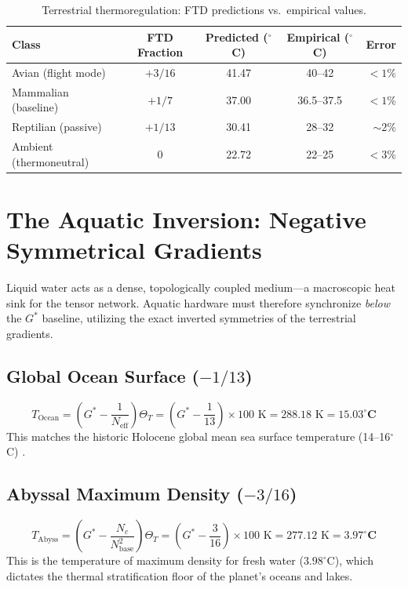 \documentclass[11pt, letterpaper]{article}
\newcommand{\G}{G^*}
\theoremstyle{definition}
\theoremstyle{remark}
\begin{document}
\begin{table}[hbt!]
\centering
\caption{Terrestrial thermoregulation: FTD predictions vs.\ empirical values.}
\label{tab:terrestrial}
\begin{tabular}{@{}lcccr@{}}
\toprule
\textbf{Class} & \textbf{FTD Fraction} & \textbf{Predicted ($^\circ$C)} & \textbf{Empirical ($^\circ$C)} & \textbf{Error} \\
\midrule
Avian (flight mode) & $+3/16$ & 41.47 & 40--42 & $<1\%$ \\
Mammalian (baseline) & $+1/7$ & 37.00 & 36.5--37.5 & $<1\%$ \\
Reptilian (passive) & $+1/13$ & 30.41 & 28--32 & $\sim 2\%$ \\
Ambient (thermoneutral) & $0$ & 22.72 & 22--25 & $<3\%$ \\
\bottomrule
\end{tabular}
\end{table}

\section{The Aquatic Inversion: Negative Symmetrical Gradients}

Liquid water acts as a dense, topologically coupled medium---a macroscopic heat sink for the tensor network. Aquatic hardware must therefore synchronize \textit{below} the $\G$ baseline, utilizing the exact inverted symmetries of the terrestrial gradients.

\subsection{Global Ocean Surface ($-1/13$)}
\begin{equation}
    T_{\text{Ocean}} = \left(\G - \frac{1}{N_{\text{eff}}}\right)\Theta_T = \left(\G - \frac{1}{13}\right) \times 100 \text{ K} = 288.18 \text{ K} = \mathbf{15.03^\circ\text{C}}
\end{equation}
This matches the historic Holocene global mean sea surface temperature (14--16$^\circ$C) \cite{Hansen2013}.

\subsection{Abyssal Maximum Density ($-3/16$)}
\begin{equation}
    T_{\text{Abyss}} = \left(\G - \frac{N_c}{N_{\text{base}}^2}\right)\Theta_T = \left(\G - \frac{3}{16}\right) \times 100 \text{ K} = 277.12 \text{ K} = \mathbf{3.97^\circ\text{C}}
\end{equation}
This is the temperature of maximum density for fresh water ($3.98^\circ$C), which dictates the thermal stratification floor of the planet's oceans and lakes.
\end{document}
